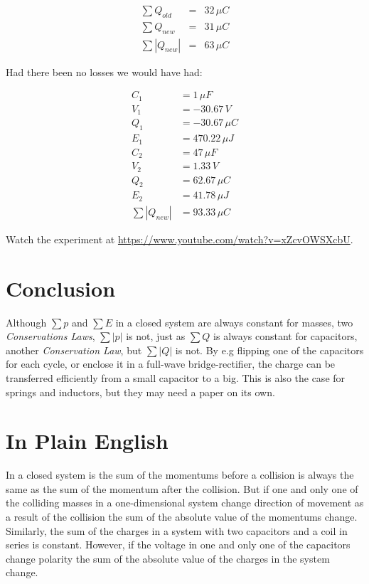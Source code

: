 \begin{eqnarray}
\sum Q_{old} &=& 32 \, \mu C \\
\sum Q_{new} &=& 31 \, \mu C \\
\sum |Q_{new}| &=& 63 \, \mu C
\end{eqnarray}

Had there been no losses we would have had:

\begin{align}
C_1 &= 1 \, \mu F \\
V_1 &= -30.67 \, V \\
Q_1 &= -30.67 \, \mu C \\
E_1 &= 470.22 \, \mu J \\
C_2 &= 47 \, \mu F \\
V_2 &= 1.33 \, V \\
Q_2 &= 62.67 \, \mu C \\
E_2 &= 41.78 \, \mu J \\
\sum |Q_{new}| &= 93.33 \, \mu C
\end{align}

Watch the experiment at \url{https://www.youtube.com/watch?v=xZcvOWSXcbU}.

\section{Conclusion}

Although $\sum p$ and $\sum E$ in a closed system are always constant for masses, two \textit{Conservations Laws}, $\sum | p |$ is not, just as $\sum Q$ is always constant for capacitors, another \textit{Conservation Law}, but $\sum | Q |$ is not.
By e.g flipping one of the capacitors for each cycle, or enclose it in a full-wave bridge-rectifier, the charge can be transferred efficiently from a small capacitor to a big.
This is also the case for springs and inductors, but they may need a paper on its own.

\appendix

\section{In Plain English}

In a closed system is the sum of the momentums before a collision is always the same as the sum of the momentum after the collision.
But if one and only one of the colliding masses in a one-dimensional system change direction of movement as a result of the collision the sum of the absolute value of the momentums change.
Similarly, the sum of the charges in a system with two capacitors and a coil in series is constant.
However, if the voltage in one and only one of the capacitors change polarity the sum of the absolute value of the charges in the system change.

